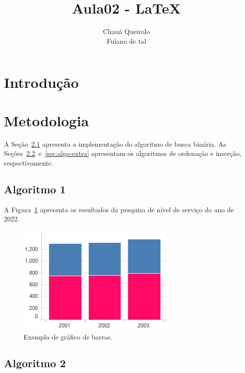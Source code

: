 \documentclass[a4paper,12pt]{article}
\title{Aula02 - \LaTeX}
\author{Chauã Queirolo \\ Fulano de tal}
\date{}
\begin{document}
\maketitle
\tableofcontents

\begin{abstract}
    \lipsum[2]
\end{abstract}


\section{Introdução}

\lipsum[2]

\section{Metodologia}
\lipsum[2]

A Seção~\ref{sec:algo1} apresenta a implementação do algoritmo de busca binária. As Seções~\ref{sec:algo2}~e~\ref{sec:algo-extra} apresentam os algoritmos de ordenação e inserção, respectivamente.

\subsection{Algoritmo 1}
\label{sec:algo1}
\lipsum[2]

A Figura~\ref{fig:grafico-barras} apresenta os resultados da pesquisa de nível de serviço do ano de 2022.

\begin{figure}[ht]
    \centering
    \includegraphics[width=8cm]{img/grafico-barras.png}
    \caption{Exemplo de gráfico de barras.}
    \label{fig:grafico-barras}
\end{figure}


\subsection{Algoritmo 2}
\label{sec:algo2}
\end{document}
